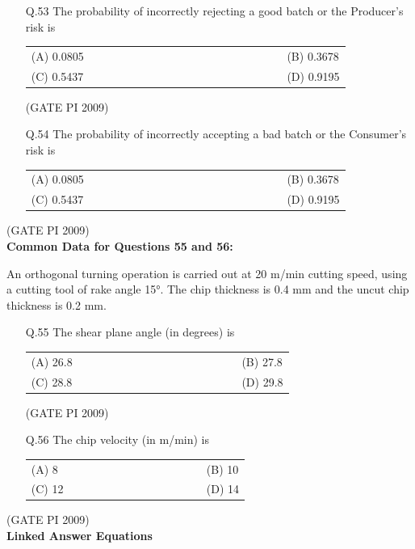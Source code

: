 \documentclass[journal,12pt,onecolumn]{IEEEtran}
\theoremstyle{remark}
\begin{document}
\begin{enumerate}[label=Q.\arabic*), leftmargin=*]
\setcounter{enumi}{52}

\item[Q.53] The probability of incorrectly rejecting a good batch or the Producer's risk is
\begin{multicols}{2}
\begin{tabular}[t]{p{0.8\linewidth} p{0.9\linewidth}}
(A) 0.0805 & (B) 0.3678 \\
(C) 0.5437 & (D) 0.9195 \\
\end{tabular}
\end{multicols}
\hfill (GATE PI 2009)
\item[Q.54] The probability of incorrectly accepting a bad batch or the Consumer's risk is
\begin{multicols}{2}
\begin{tabular}[t]{p{0.8\linewidth} p{0.9\linewidth}}
(A) 0.0805 & (B) 0.3678 \\
(C) 0.5437 & (D) 0.9195 \\
\end{tabular}
\end{multicols}
\end{enumerate}
\hfill (GATE PI 2009) \\
\textbf{Common Data for Questions 55 and 56:}

An orthogonal turning operation is carried out at 20 m/min cutting speed, using a cutting tool of rake angle 15°. The chip thickness is 0.4 mm and the uncut chip thickness is 0.2 mm.

\begin{enumerate}[label=Q.\arabic*, leftmargin=*]
\setcounter{enumi}{54}

\item[Q.55] The shear plane angle (in degrees) is
\begin{multicols}{2}
\begin{tabular}[t]{p{0.8\linewidth} p{0.9\linewidth}}
(A) 26.8 & (B) 27.8 \\
(C) 28.8 & (D) 29.8 \\
\end{tabular}
\end{multicols}
\hfill (GATE PI 2009)
\item[Q.56] The chip velocity (in m/min) is
\begin{multicols}{2}
\begin{tabular}[t]{p{0.8\linewidth} p{0.9\linewidth}}
(A) 8 & (B) 10 \\
(C) 12 & (D) 14 \\
\end{tabular}
\end{multicols}
\end{enumerate}
\hfill (GATE PI 2009) \\
\textbf{\large{Linked Answer Equations}}
\end{document}

